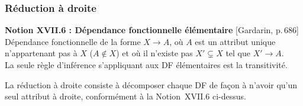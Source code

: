 \documentclass[12pt, a4paper]{article}
\newcommand{\citeg}[1]{\textnormal{\footnotesize[#1]}}
\begin{document}
    \subsubsection*{Réduction à droite}
    \bigskip
    \begin{rappelbox}
        \textbf{Notion XVII.6 : Dépendance fonctionnelle élémentaire}
        \hfill\citeg{Gardarin, p.\,686}\\[0.5em]
        Dépendance fonctionnelle de la forme $X \rightarrow A$, où $A$ est un attribut unique n'appartenant
        pas à $X$ ($A \notin X$) et où il n'existe pas $X' \subsetneq X$ tel que $X' \rightarrow A$.\\[0.3em]
        La seule règle d'inférence s'appliquant aux DF élémentaires est la transitivité.
    \end{rappelbox}

    La réduction à droite consiste à décomposer chaque DF de façon à n'avoir qu'un seul attribut à
    droite, conformément à la Notion~XVII.6 ci-dessus.
\end{document}
